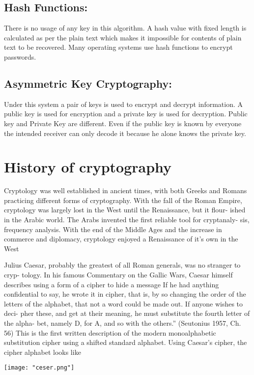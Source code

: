 \documentclass{report}
\begin{document}
{{\subsection{Hash Functions:}
\Large{There is no usage of any key in this algorithm. A hash value with fixed length is calculated as per the plain text which makes it impossible for contents of plain text to be recovered. Many operating systems use hash functions to encrypt passwords.}

\subsection{Asymmetric Key Cryptography:}
\Large{Under this system a pair of keys is used to encrypt and decrypt information. A public key is used for encryption and a private key is used for decryption. Public key and Private Key are different. Even if the public key is known by everyone the intended receiver can only decode it because he alone knows the private key.}


\section{History of cryptography}
\Large{Cryptology was well established in ancient times, with both Greeks and
Romans practicing different forms of cryptography. With the fall of the Roman
Empire, cryptology was largely lost in the West until the Renaissance, but it flour-
ished in the Arabic world. The Arabs invented the first reliable tool for cryptanaly-
sis, frequency analysis. With the end of the Middle Ages and the increase in
commerce and diplomacy, cryptology enjoyed a Renaissance of it’s own in the
West


Julius Caesar, probably the greatest of all Roman generals, was no stranger to cryp-
tology. In his famous Commentary on the Gallic Wars, Caesar himself describes
using a form of a cipher to hide a message If he had anything confidential to say, he wrote it in cipher, that is, by so changing the order of the
letters of the alphabet, that not a word could be made out. If anyone wishes to deci-
pher these, and get at their meaning, he must substitute the fourth letter of the alpha-
bet, namely D, for A, and so with the others.” (Seutonius 1957, Ch. 56) This is the
first written description of the modern monoalphabetic substitution cipher using a
shifted standard alphabet. Using Caesar’s cipher, the cipher alphabet looks like}

\begin{center}
\texttt{[image: "ceser.png"]}
\end{center}

}}
\end{document}
